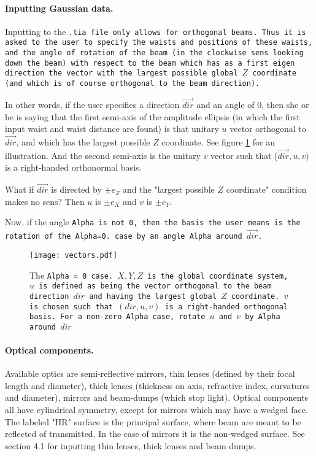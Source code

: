 \documentclass{article}
\begin{document}
\paragraph{Inputting Gaussian data.}Inputting to the \tt{.tia} file only allows for orthogonal beams. Thus it is asked to the user to specify the waists and positions of these waists, and the angle of rotation of the beam (in the clockwise sens looking down the beam) with respect to the beam which has as a first eigen direction the vector with the largest possible global $Z$ coordinate (and which is of course orthogonal to the beam direction). 

In other words, if the user specifies a direction $\vec{dir}$ and an angle of 0, then she or he is saying that the first semi-axis of the amplitude ellipsis (in which the first input waist and waist distance are found) is that unitary $u$ vector orthogonal to $\vec{dir}$, and which has the largest possible $Z$ coordinate. See figure \ref{vectors} for an illustration. And the second semi-axis is the unitary $v$ vector such that ($\vec{dir}, u, v)$ is a right-handed orthonormal basis.

What if $\vec{dir}$ is directed by $\pm e_Z$ and the "largest possible $Z$ coordinate" condition makes no sens? Then $u$ is $\pm e_X$ and $v$ is $\pm e_Y$.

Now, if the angle \tt{Alpha} is not 0, then the basis the user means is the rotation of the \tt{Alpha=0.} case by an angle \tt{Alpha} around $\vec{dir}$.

\begin{figure}[h]
\begin{center}
\texttt{[image: vectors.pdf]}
\caption{The \tt{Alpha = 0} case. $X, Y, Z$ is the global coordinate system, $u$ is defined as being the vector orthogonal to the beam direction $dir$ and having the largest global $Z$ coordinate. $v$ is chosen such that $(dir, u, v)$ is a right-handed orthogonal basis. For a non-zero  \tt{Alpha} case, rotate $u$ and $v$ by \tt{Alpha} around $dir$}
\label{vectors}
\end{center}
\end{figure}

\paragraph{Optical components.}Available optics are semi-reflective mirrors, thin lenses (defined by their focal length and diameter), thick lenses (thickness on axis, refractive index, curvatures and diameter), mirrors and beam-dumps (which stop light). Optical components all have cylindrical symmetry, except for mirrors which may have a wedged face. The labeled "HR" surface is the principal surface, where beam are meant to be reflected of transmitted. In the case of mirrors it is the non-wedged surface. See section 4.1 for inputting thin lenses, thick lenses and beam dumps.
\end{document}
